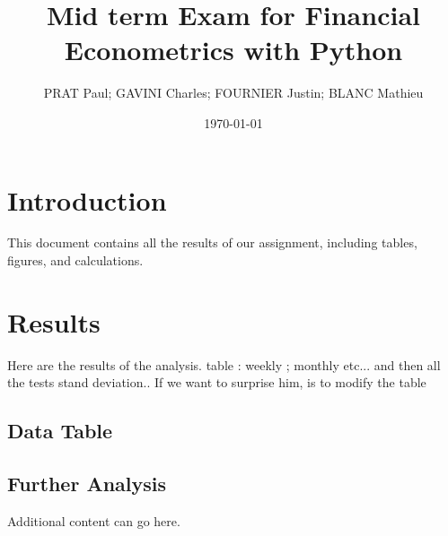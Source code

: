 \documentclass{article}
\begin{document}
\title{Mid term Exam for Financial Econometrics with Python}
\author{PRAT Paul; GAVINI Charles; FOURNIER Justin; BLANC Mathieu}
\date{\today}

\maketitle

\section{Introduction}
This document contains all the results of our assignment, including tables, figures, and calculations.
\section{Results}

Here are the results of the analysis.
table : weekly ; monthly etc... and then all the tests stand deviation..
If we want to surprise him, is to modify the table
\subsection{Data Table}

  

\subsection{Further Analysis}

Additional content can go here.
\end{document}

